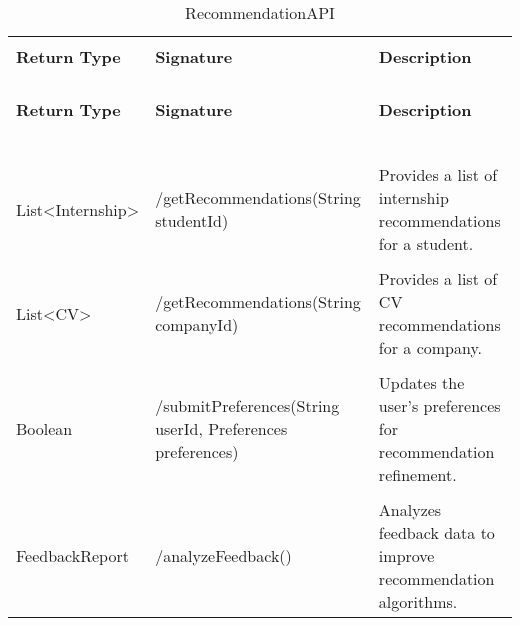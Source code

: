 \begin{longtable}{p{}p{}p{}}
    \caption{RecommendationAPI}
    \vspace{0.5em}\\
    \hline
    \vspace{0.5em}\\
    \textbf{Return Type} & \textbf{Signature} & \textbf{Description} \\
    \vspace{0.5em}\\
    \hline
    \vspace{0.5em}\\
    \endfirsthead
    \vspace{0.5em}\\
    \hline
    \vspace{0.5em}\\
    \textbf{Return Type} & \textbf{Signature} & \textbf{Description} \\
    \vspace{0.5em}\\
    \hline
    \vspace{0.5em}\\
    \endhead
    
    \vspace{0.5em}\\
    \hline
    \vspace{0.5em}\\
    \endfoot
    
    \vspace{0.5em}\\
    \hline
    \vspace{0.5em}\\
    \endlastfoot
    
    List<Internship> &
    /getRecommendations(String studentId) &
    Provides a list of internship recommendations for a student. \\
    \vspace{0.5em}\\
    List<CV> &
    /getRecommendations(String companyId) &
    Provides a list of CV recommendations for a company. \\
    \vspace{0.5em}\\
    Boolean &
    /submitPreferences(String userId, Preferences preferences) &
    Updates the user's preferences for recommendation refinement. \\
    \vspace{0.5em}\\
    FeedbackReport &
    /analyzeFeedback() &
    Analyzes feedback data to improve recommendation algorithms. \\

\end{longtable}

